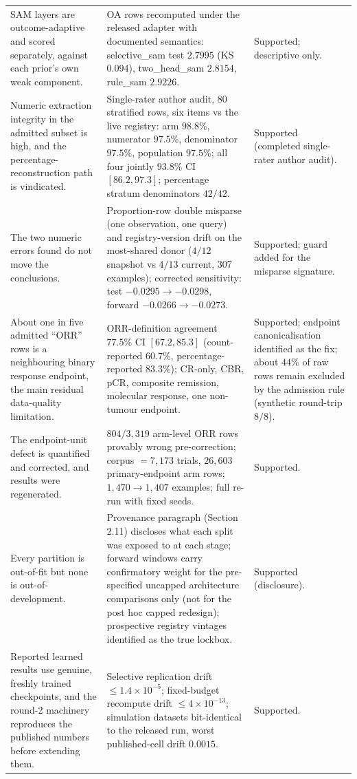 \documentclass[11pt]{article}
\begin{document}
\begin{longtable}{p{} p{} p{}}
SAM layers are outcome-adaptive and scored separately, against each prior's
own weak component. & OA rows recomputed under the released adapter with
documented semantics: selective\_sam test $2.7995$ (KS $0.094$), two\_head\_sam
$2.8154$, rule\_sam $2.9226$. & Supported; descriptive only. \\
Numeric extraction integrity in the admitted subset is high, and the
percentage-reconstruction path is vindicated. & Single-rater author audit, 80 stratified
rows, six items vs the live registry: arm $98.8\%$, numerator $97.5\%$,
denominator $97.5\%$, population $97.5\%$; all four jointly $93.8\%$ CI
$[86.2,97.3]$; percentage stratum denominators $42/42$. & Supported
(completed single-rater author audit). \\
The two numeric errors found do not move the conclusions. & Proportion-row
double misparse (one observation, one query) and registry-version drift on
the most-shared donor ($4/12$ snapshot vs $4/13$ current, 307 examples);
corrected sensitivity: test $-0.0295 \to -0.0298$, forward $-0.0266 \to
-0.0273$. & Supported; guard added for the misparse signature. \\
About one in five admitted ``ORR'' rows is a neighbouring binary response
endpoint, the main residual data-quality limitation. & ORR-definition
agreement $77.5\%$ CI $[67.2,85.3]$ (count-reported $60.7\%$,
percentage-reported $83.3\%$); CR-only, CBR, pCR, composite remission,
molecular response, one non-tumour endpoint. & Supported; endpoint
canonicalisation identified as the fix; about $44\%$ of raw rows remain
excluded by the admission rule (synthetic round-trip $8/8$). \\
The endpoint-unit defect is quantified and corrected, and results were
regenerated. & $804/3{,}319$ arm-level ORR rows provably wrong pre-correction;
corpus $= 7{,}173$ trials, $26{,}603$ primary-endpoint arm rows;
$1{,}470 \to 1{,}407$ examples; full re-run with fixed seeds. & Supported. \\
Every partition is out-of-fit but none is out-of-development. & Provenance
paragraph (Section 2.11) discloses what each split was exposed to at each
stage; forward windows carry confirmatory weight for the pre-specified
uncapped architecture comparisons only (not for the post hoc capped
redesign); prospective registry
vintages identified as the true lockbox. & Supported (disclosure). \\
Reported learned results use genuine, freshly trained checkpoints, and the
round-2 machinery reproduces the published numbers before extending them. &
Selective replication drift $\le 1.4\times10^{-5}$; fixed-budget recompute
drift $\le 4\times10^{-13}$; simulation datasets bit-identical to the
released run, worst published-cell drift $0.0015$. & Supported. \\
\bottomrule
\end{longtable}
\end{document}
